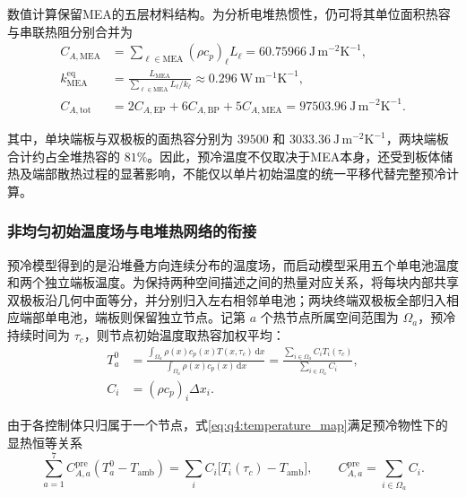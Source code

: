 \documentclass[bwprint]{gmcmthesis}
\numberwithin{figure}{section}
\begin{document}
数值计算保留MEA的五层材料结构。为分析电堆热惯性，仍可将其单位面积热容与串联热阻分别合并为
\begin{equation}
\begin{aligned}
C_{A,\mathrm{MEA}}&=\sum_{\ell\in\mathrm{MEA}}(\rho c_p)_\ell L_\ell
=60.75966\ \mathrm{J\,m^{-2}K^{-1}},\\
k_{\mathrm{MEA}}^{\mathrm{eq}}&=\frac{L_{\mathrm{MEA}}}{\displaystyle\sum_{\ell\in\mathrm{MEA}}L_\ell/k_\ell}
\approx0.296\ \mathrm{W\,m^{-1}K^{-1}},\\
C_{A,\mathrm{tot}}&=2C_{A,\mathrm{EP}}+6C_{A,\mathrm{BP}}+5C_{A,\mathrm{MEA}}
=97503.96\ \mathrm{J\,m^{-2}K^{-1}}.
\end{aligned}
\tag{7-6}\label{eq:q4:precool_capacity}
\end{equation}

其中，单块端板与双极板的面热容分别为 $39500$ 和 $3033.36\ \mathrm{J\,m^{-2}K^{-1}}$，两块端板合计约占全堆热容的 $81\%$。因此，预冷温度不仅取决于MEA本身，还受到板体储热及端部散热过程的显著影响，不能仅以单片初始温度的统一平移代替完整预冷计算。

\subsubsection{非均匀初始温度场与电堆热网络的衔接}

预冷模型得到的是沿堆叠方向连续分布的温度场，而启动模型采用五个单电池温度和两个独立端板温度。为保持两种空间描述之间的热量对应关系，将每块内部共享双极板沿几何中面等分，并分别归入左右相邻单电池；两块终端双极板全部归入相应端部单电池，端板则保留独立节点。记第 $a$ 个热节点所属空间范围为 $\Omega_a$，预冷持续时间为 $\tau_c$，则节点初始温度取热容加权平均：
\begin{equation}
\begin{aligned}
T_a^0&=\frac{\displaystyle\int_{\Omega_a}\rho(x)c_p(x)T(x,\tau_c)\,\mathrm dx}
{\displaystyle\int_{\Omega_a}\rho(x)c_p(x)\,\mathrm dx}
=\frac{\displaystyle\sum_{i\in\Omega_a}C_iT_i(\tau_c)}
{\displaystyle\sum_{i\in\Omega_a}C_i},\\
C_i&=(\rho c_p)_i\Delta x_i.
\end{aligned}
\tag{7-7}\label{eq:q4:temperature_map}
\end{equation}

由于各控制体只归属于一个节点，式\eqref{eq:q4:temperature_map}满足预冷物性下的显热恒等关系
\begin{equation}
\sum_{a=1}^{7}C_{A,a}^{\mathrm{pre}}(T_a^0-T_{\mathrm{amb}})
=\sum_iC_i\big[T_i(\tau_c)-T_{\mathrm{amb}}\big],\qquad
C_{A,a}^{\mathrm{pre}}=\sum_{i\in\Omega_a}C_i.
\tag{7-8}\label{eq:q4:map_energy}
\end{equation}
\end{document}
